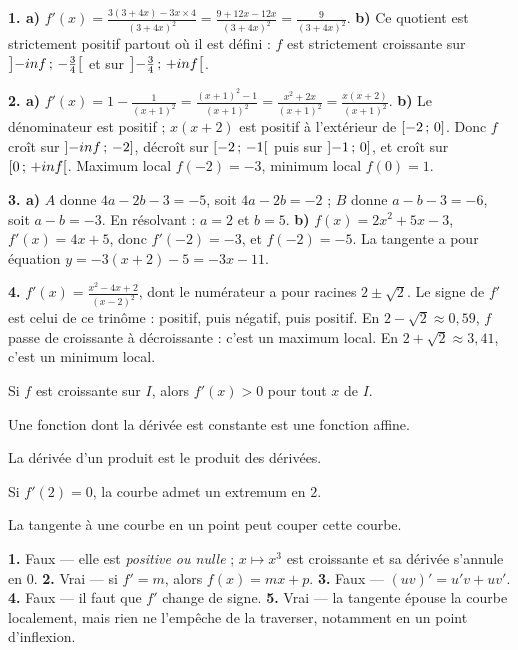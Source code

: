 \begin{corrige}[annales]
\textbf{1. a)} $f'(x) = \frac{3(3+4x)-3x\times4}{(3+4x)^{2}}
= \frac{9+12x-12x}{(3+4x)^{2}} = \frac{9}{(3+4x)^{2}}$.
\textbf{b)} Ce quotient est strictement positif partout où il est défini :
$f$ est strictement croissante sur $\left]-inf\,;\,-\frac34\right[$ et sur
$\left]-\frac34\,;\,+inf\right[$.

\textbf{2. a)} $f'(x) = 1-\frac{1}{(x+1)^{2}} = \frac{(x+1)^{2}-1}{(x+1)^{2}}
= \frac{x^{2}+2x}{(x+1)^{2}} = \frac{x(x+2)}{(x+1)^{2}}$.
\textbf{b)} Le dénominateur est positif ; $x(x+2)$ est positif à l'extérieur
de $\left[-2\,;\,0\right]$. Donc $f$ croît sur $\left]-inf\,;\,-2\right]$,
décroît sur $\left[-2\,;\,-1\right[$ puis sur $\left]-1\,;\,0\right]$, et croît
sur $\left[0\,;\,+inf\right[$. Maximum local $f(-2) = -3$, minimum local
$f(0) = 1$.

\textbf{3. a)} $A$ donne $4a-2b-3 = -5$, soit $4a-2b = -2$ ; $B$ donne
$a-b-3 = -6$, soit $a-b = -3$. En résolvant : $a = 2$ et $b = 5$.
\textbf{b)} $f(x) = 2x^{2}+5x-3$, $f'(x) = 4x+5$, donc $f'(-2) = -3$, et
$f(-2) = -5$. La tangente a pour équation $y = -3(x+2)-5 = -3x-11$.

\textbf{4.} $f'(x) = \frac{x^{2}-4x+2}{(x-2)^{2}}$, dont le numérateur a pour
racines $2\pm\sqrt2$. Le signe de $f'$ est celui de ce trinôme : positif,
puis négatif, puis positif. En $2-\sqrt2 \approx 0{,}59$, $f$ passe de
croissante à décroissante : c'est un maximum local. En
$2+\sqrt2 \approx 3{,}41$, c'est un minimum local.
\end{corrige}

\begin{vraifaux}
\exo Si $f$ est croissante sur $I$, alors $f'(x) > 0$ pour tout $x$ de $I$.

\exo Une fonction dont la dérivée est constante est une fonction affine.

\exo La dérivée d'un produit est le produit des dérivées.

\exo Si $f'(2) = 0$, la courbe admet un extremum en $2$.

\exo La tangente à une courbe en un point peut couper cette courbe.
\end{vraifaux}

\begin{corrige}
\textbf{1.} Faux — elle est \emph{positive ou nulle} ; $x \mapsto x^{3}$ est
croissante et sa dérivée s'annule en $0$.
\textbf{2.} Vrai — si $f' = m$, alors $f(x) = mx+p$.
\textbf{3.} Faux — $(uv)' = u'v+uv'$.
\textbf{4.} Faux — il faut que $f'$ change de signe.
\textbf{5.} Vrai — la tangente épouse la courbe localement, mais rien ne
l'empêche de la traverser, notamment en un point d'inflexion.
\end{corrige}

